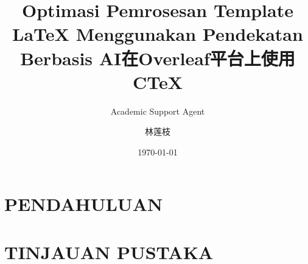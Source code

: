 \documentclass{ctexart}
\title{Optimasi Pemrosesan Template LaTeX Menggunakan Pendekatan Berbasis AI}
\author{Academic Support Agent}
\date{\today}
\begin{document}
\maketitle

\begin{abstract}

\end{abstract}

\chapter{PENDAHULUAN}


\chapter{TINJAUAN PUSTAKA}


\usepackage[margin=2cm,a4paper]{geometry}

\setmainfont{Caladea}



\usepackage{minted}

\usepackage[breaklinks]{hyperref}

\title{在Overleaf平台上使用C\TeX}
\author{林莲枝}
\end{document}
